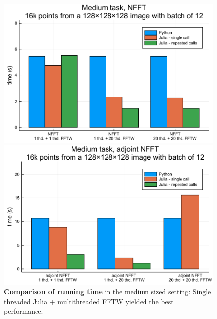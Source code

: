 \begin{figure}[htbp]
    \centering
    \begin{minipage}{0.48\linewidth}
        \centering
        \includegraphics[width=\linewidth]{images/nfft_medium_forw.pdf}
    \end{minipage}
    \begin{minipage}{0.48\linewidth}
        \centering
        \includegraphics[width=\linewidth]{images/nfft_medium_backw.pdf}
    \end{minipage}
    \caption{\textbf{Comparison of running time}  in the medium sized setting: Single threaded Julia + multithreaded FFTW yielded the best performance.}
    \label{fig:nfft_medium}
\end{figure}

